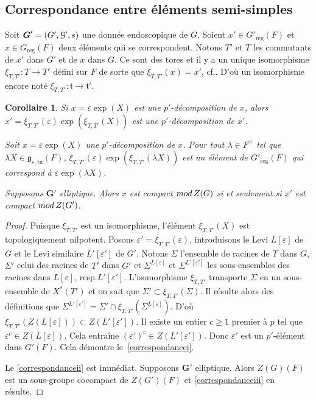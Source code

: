 \documentclass[11pt]{article}
\newcommand{\cf}{cf.\xspace}
\newcommand{\resp}{resp.\xspace}
\newcommand{\skpt}{\smallskip}
\numberwithin{equation}{section}\providecommand{\og}{«\,}\providecommand{\fg}{\,»}
\let\mathcal \EuScript
\let\oldenumerate\enumerate
\renewcommand{\enumerate}{\oldenumerate\itemindent0pt}
\newenvironment{enumeratei}
{\bgroup\def\theenumi{\roman{enumi}}\def\theenumii{\arabic{enumii}}\oldenumerate}
{\endenumerate\egroup}
\let\epsilon\varepsilon
\newcommand{\rmod}{\textup{mod}\,}
\newcommand{\frg}{\mathfrak{g}}
\newcommand{\frt}{\mathfrak{t}}
\newcommand{\reg}{\mathrm{reg}}
\newcommand{\tn}{\mathrm{tn}}
\newcommand{\bG}{\boldsymbol{G}}
\newcommand{\cG}{\mathcal{G}}
\theoremstyle{plain}
\newtheorem*{cor*}{Corollaire}
\theoremstyle{definition}
\begin{document}
\subsection{Correspondance entre éléments semi-simples}\label{correspondance}
Soit $\bG'=(G',\cG',s)$ une donnée endoscopique de $G$. Soient $x'\in G'_{\reg}(F)$ et $x\in G_{\reg}(F)$ deux éléments qui se correspondent. Notons $T'$ et $T$ les commutants de $x'$ dans $G'$ et de $x$ dans $G$. Ce sont des tores et il y a un unique isomorphisme $\xi_{T,T'}:T\to T'$ défini sur $F$ de sorte que $\xi_{T,T'}(x)=x'$, \cf \cite[I.1.10]{MW}. D'où un isomorphisme encore noté $\xi_{T,T'}:\frt\to \frt'$.

\skpt
\begin{cor*}
\begin{enumeratei}
\item\label{correspondancei}
Si $x=\epsilon \exp(X)$ est une $p'$-décomposition de $x$, alors $x'=\xi_{T,T'}(\epsilon)\exp(\xi_{T,T'}(X))$ est une $p'$-décomposition de $x'$.

\item\label{correspondanceii}
Soit $x=\epsilon \exp(X)$ une $p'$-décomposition de $x$. Pour tout $\lambda\in F^{\times}$ tel que $ \lambda X\in \frg_{\epsilon,\tn}(F)$, $\xi_{T,T'}(\epsilon)\exp(\xi_{T,T'}(\lambda X))$ est un élément de $G'_{\reg}(F)$ qui correspond à $\epsilon \exp(\lambda X)$.

\item\label{correspondanceiii}
Supposons $\bG'$ elliptique. Alors $x$ est compact $\rmod Z(G)$ si et seulement si $x'$ est compact $\rmod Z(G')$.
\end{enumeratei}
\end{cor*}

\begin{proof}
Puisque $\xi_{T,T'}$ est un isomorphisme, l'élément $\xi_{T,T'}(X)$ est topologiquement nilpotent. Posons $\epsilon'=\xi_{T,T'}(\epsilon)$, introduisons le Levi $L[\epsilon]$ de $G$ et le Levi similaire $L'[\epsilon']$ de $G'$. Notons $\Sigma$ l'ensemble de racines de $T$ dans $G$, $\Sigma'$ celui des racines de $T'$ dans $G'$ et $\Sigma^{L[\epsilon]}$ et $\Sigma^{L'[\epsilon']}$ les sous-ensembles des racines dans $L[\epsilon]$, \resp $L'[\epsilon']$. L'isomorphisme $\xi_{T,T'}$ transporte $\Sigma$ en un sous-ensemble de $X^*(T')$ et on sait que $\Sigma'\subset \xi_{T,T'}(\Sigma)$. Il résulte alors des définitions que $\Sigma^{L'[\epsilon']}=\Sigma'\cap \xi_{T,T'}(\Sigma^{L[\epsilon]})$. D'où $\xi_{T,T'}(Z(L[\epsilon]))\subset Z(L'[\epsilon'])$. Il existe un entier $c\geq1$ premier à $p$ tel que $\epsilon^c\in Z(L[\epsilon])$. Cela entraîne $(\epsilon')^c\in Z(L'[\epsilon'])$. Donc $\epsilon'$ est un $p'$-élément dans $G'(F)$. Cela démontre le~\eqref{correspondancei}.

Le \eqref{correspondanceii} est immédiat. Supposons $\bG'$ elliptique. Alors $Z(G)(F)$ est un sous-groupe cocompact de $Z(G')(F)$ et \eqref{correspondanceiii} en résulte.
\end{proof}
\end{document}
